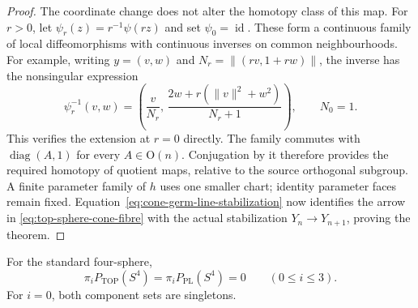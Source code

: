 \begin{proof}
The coordinate change does not alter the homotopy class of this
map.  For $r>0$, let $\psi_r(z)=r^{-1}\psi(rz)$ and set
$\psi_0=\operatorname{id}$.  These form a continuous family
of local diffeomorphisms with continuous inverses on common
neighbourhoods.  For example, writing $y=(v,w)$ and
$N_r=\|(rv,1+rw)\|$, the inverse has the nonsingular expression
\[
 \psi_r^{-1}(v,w)=
 \left(\frac{v}{N_r},\,
       \frac{2w+r(\|v\|^2+w^2)}{N_r+1}\right),
 \qquad N_0=1.
\]
This verifies the extension at $r=0$ directly.  The family
commutes with $\operatorname{diag}(A,1)$ for every
$A\in\mathrm O(n)$.  Conjugation by it therefore provides
the required homotopy of quotient maps, relative to the source
orthogonal subgroup.  A finite parameter family of $h$ uses
one smaller chart; identity parameter faces remain fixed.
Equation~\eqref{eq:cone-germ-line-stabilization} now identifies
the arrow in \eqref{eq:top-sphere-cone-fibre} with the actual
stabilization $Y_n\to Y_{n+1}$, proving the theorem.
\end{proof}

\begin{corollary}\label{cor:four-sphere-low-concordance-groups}
For the standard four-sphere,
\[
 \pi_iP_{\mathrm{TOP}}(S^4)=\pi_iP_{\mathrm{PL}}(S^4)=0
                       \qquad(0\leq i\leq3).
\]
For $i=0$, both component sets are singletons.
\end{corollary}

